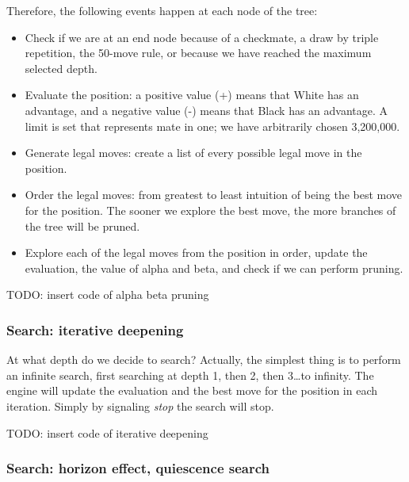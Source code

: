 \vspace{1em}

\noindent Therefore, the following events happen at each node of the tree:

\begin{itemize}
    \item Check if we are at an end node because of a checkmate, a draw by triple repetition, the 50-move rule, or because we have reached the maximum selected depth.
    \item Evaluate the position: a positive value (+) means that White has an advantage, and a negative value (-) means that Black has an advantage. A limit is set that represents mate in one; we have arbitrarily chosen 3,200,000.
    \item Generate legal moves: create a list of every possible legal move in the position.
    \item Order the legal moves: from greatest to least intuition of being the best move for the position. The sooner we explore the best move, the more branches of the tree will be pruned.
    \item Explore each of the legal moves from the position in order, update the evaluation, the value of alpha and beta, and check if we can perform pruning.
\end{itemize}

\vspace{1em}

TODO: insert code of alpha beta pruning

\subsubsection{Search: iterative deepening}

At what depth do we decide to search? Actually, the simplest thing is to perform an infinite search, first searching at depth 1, then 2, then 3\ldots to infinity. The engine will update the evaluation and the best move for the position in each iteration. Simply by signaling \textit{stop} the search will stop.

\vspace{1em}

TODO: insert code of iterative deepening

\subsubsection{Search: horizon effect, quiescence search}

